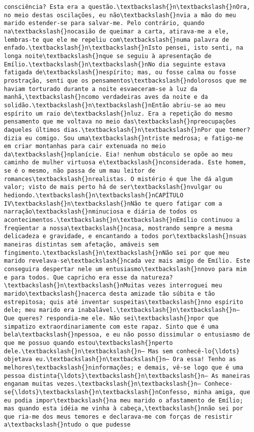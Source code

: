 \documentclass[11pt]{article}
\begin{document}
\begin{Verbatim}[commandchars=\\\{\}]
consciência? Esta era a questão.\textbackslash{}n\textbackslash{}nOra, no meio destas oscilações, eu não\textbackslash{}nvia a mão do meu marido estender-se para salvar-me. Pelo contrário, quando na\textbackslash{}nocasião de queimar a carta, atirava-me a ele, lembras-te que ele me repeliu com\textbackslash{}numa palavra de enfado.\textbackslash{}n\textbackslash{}nIsto pensei, isto senti, na longa noite\textbackslash{}nque se seguiu à apresentação de Emílio.\textbackslash{}n\textbackslash{}nNo dia seguinte estava fatigada de\textbackslash{}nespírito; mas, ou fosse calma ou fosse prostração, senti que os pensamentos\textbackslash{}ndolorosos que me haviam torturado durante a noite esvaeceram-se à luz da manhã,\textbackslash{}ncomo verdadeiras aves da noite e da solidão.\textbackslash{}n\textbackslash{}nEntão abriu-se ao meu espírito um raio de\textbackslash{}nluz. Era a repetição do mesmo pensamento que me voltava no meio das\textbackslash{}npreocupações daqueles últimos dias.\textbackslash{}n\textbackslash{}nPor que temer? dizia eu comigo. Sou uma\textbackslash{}ntriste medrosa; e fatigo-me em criar montanhas para cair extenuada no meio da\textbackslash{}nplanície. Eia! nenhum obstáculo se opõe ao meu caminho de mulher virtuosa e\textbackslash{}nconsiderada. Este homem, se é o mesmo, não passa de um mau leitor de romances\textbackslash{}nrealistas. O mistério é que lhe dá algum valor; visto de mais perto há de ser\textbackslash{}nvulgar ou hediondo.\textbackslash{}n\textbackslash{}nCAPÍTULO IV\textbackslash{}n\textbackslash{}nNão te quero fatigar com a narração\textbackslash{}nminuciosa e diária de todos os acontecimentos.\textbackslash{}n\textbackslash{}nEmílio continuou a freqüentar a nossa\textbackslash{}ncasa, mostrando sempre a mesma delicadeza e gravidade, e encantando a todos por\textbackslash{}nsuas maneiras distintas sem afetação, amáveis sem fingimento.\textbackslash{}n\textbackslash{}nNão sei por que meu marido revelava-se\textbackslash{}ncada vez mais amigo de Emílio. Este conseguira despertar nele um entusiasmo\textbackslash{}nnovo para mim e para todos. Que capricho era esse da natureza?\textbackslash{}n\textbackslash{}nMuitas vezes interroguei meu marido\textbackslash{}nacerca desta amizade tão súbita e tão estrepitosa; quis até inventar suspeitas\textbackslash{}nno espírito dele; meu marido era inabalável.\textbackslash{}n\textbackslash{}n— Que queres? respondia-me ele. Não sei\textbackslash{}npor que simpatizo extraordinariamente com este rapaz. Sinto que é uma bela\textbackslash{}npessoa, e eu não posso dissimular o entusiasmo de que me possuo quando estou\textbackslash{}nperto dele.\textbackslash{}n\textbackslash{}n— Mas sem conhecê-lo{\ldots} objetava eu.\textbackslash{}n\textbackslash{}n— Ora essa! Tenho as melhores\textbackslash{}ninformações; e demais, vê-se logo que é uma pessoa distinta{\ldots}\textbackslash{}n\textbackslash{}n— As maneiras enganam muitas vezes.\textbackslash{}n\textbackslash{}n— Conhece-se{\ldots}\textbackslash{}n\textbackslash{}nConfesso, minha amiga, que eu podia impor\textbackslash{}na meu marido o afastamento de Emílio; mas quando esta idéia me vinha à cabeça,\textbackslash{}nnão sei por que ria-me dos meus temores e declarava-me com forças de resistir a\textbackslash{}ntudo o que pudesse 
\end{Verbatim}
\end{document}
